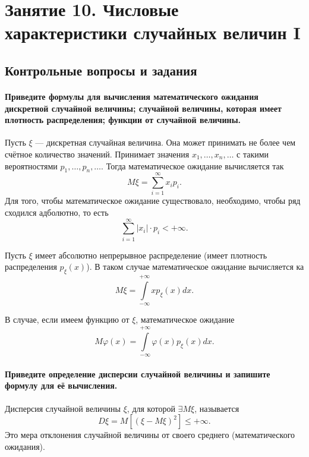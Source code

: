 \chapter*{Занятие 10. Числовые характеристики случайных величин I}

\section*{Контрольные вопросы и задания}

\subsubsection*{Приведите формулы для вычисления математического ожидания дискретной случайной величины; случайной величины, которая имеет плотность распределения; функции от случайной величины.}

Пусть $ \xi $ --- дискретная случайная величина.
Она может принимать не более чем счётное количество значений.
Принимает значения $x_1, \dotsc, x_n, \dotsc $ с такими вероятностями $p_1, \dotsc, p_n, \dotsc $.
Тогда математическое ожидание вычисляется так
$$M \xi =
\sum \limits_{i=1}^{ \infty } x_i p_i.$$
Для того, чтобы математическое ожидание существовало, необходимо, чтобы ряд сходился адболютно, то есть
$$ \sum \limits_{i=1}^{ \infty } \left| x_i \right| \cdot p_i < + \infty.$$

Пусть $ \xi $ имеет абсолютно непрерывное распределение (имеет плотность распределения $p_{ \xi } \left( x \right) $).
В таком случае математическое ожидание вычисляется ка
$$M \xi =
\int \limits_{- \infty }^{+ \infty } xp_{ \xi } \left( x \right) dx.$$

В случае, если имеем функцию от $ \xi $, математическое ожидание
$$M \varphi \left( x \right) =
\int \limits_{- \infty }^{+ \infty } \varphi \left( x \right) p_{ \xi } \left( x \right) dx.$$

\subsubsection*{Приведите определение дисперсии случайной величины и запишите формулу для её вычисления.}

Дисперсия случайной величины $ \xi $, для которой $ \exists M \xi $,
называется
$$D \xi =
M \left[ \left( \xi - M \xi \right)^2 \right] \leq + \infty.$$
Это мера отклонения случайной величины от своего среднего (математического ожидания).

